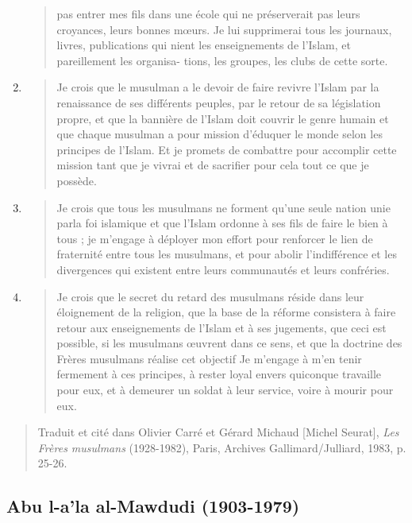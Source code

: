\begin{enumerate}
\begin{quote}
  pas entrer mes fils dans une école qui ne préserverait pas leurs
  croyances, leurs bonnes mœurs. Je lui supprimerai tous les journaux,
  livres, publications qui nient les enseignements de l'Islam, et
  pareillement les organisa- tions, les groupes, les clubs de cette
  sorte.
  \end{quote}
\item
  \begin{quote}
  Je crois que le musulman a le devoir de faire revivre l'Islam par la
  renaissance de ses différents peuples, par le retour de sa législation
  propre, et que la bannière de l'Islam doit couvrir le genre humain et
  que chaque musulman a pour mission d'éduquer le monde selon les
  principes de l'Islam. Et je promets de combattre pour accomplir cette
  mission tant que je vivrai et de sacrifier pour cela tout ce que je
  possède.
  \end{quote}
\item
  \begin{quote}
  Je crois que tous les musulmans ne forment qu'une seule nation unie
  parla foi islamique et que l'Islam ordonne à ses fils de faire le bien
  à tous ; je m'engage à déployer mon effort pour renforcer le lien de
  fraternité entre tous les musulmans, et pour abolir l'indifférence et
  les divergences qui existent entre leurs communautés et leurs
  confréries.
  \end{quote}
\item
  \begin{quote}
  Je crois que le secret du retard des musulmans réside dans leur
  éloignement de la religion, que la base de la réforme consistera à
  faire retour aux enseignements de l'Islam et à ses jugements, que ceci
  est possible, si les musulmans œuvrent dans ce sens, et que la
  doctrine des Frères musulmans réalise cet objectif Je m'engage à m'en
  tenir fermement à ces principes, à rester loyal envers quiconque
  travaille pour eux, et à demeurer un soldat à leur service, voire à
  mourir pour eux.
  \end{quote}
\end{enumerate}

\begin{quote}
Traduit et cité dans Olivier Carré et Gérard Michaud {[}Michel
Seurat{]}, \emph{Les Frères musulmans} (1928-1982), Paris, Archives
Gallimard/Julliard, 1983, p. 25-26.
\end{quote}

\hypertarget{abu-l-ala-al-mawdudi-1903-1979}{%
\subsection{\texorpdfstring{{Abu l-a'la al-Mawdudi
(1903-1979)}}{Abu l-a'la al-Mawdudi (1903-1979)}}\label{abu-l-ala-al-mawdudi-1903-1979}}

